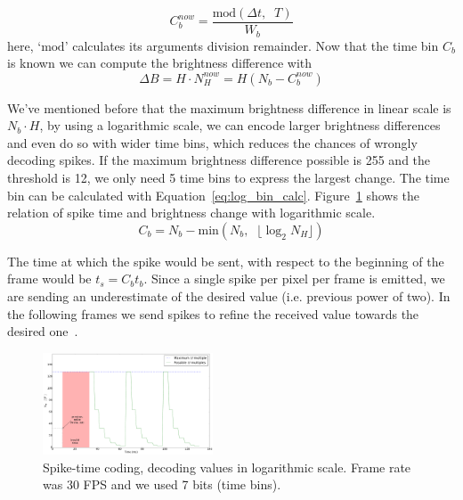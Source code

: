 \documentclass[conference]{IEEEtran}
\begin{document}
\begin{equation}
C^{now}_{b} = \frac{ \mathrm{mod}\left(\Delta t, \;\; T\right) }{ W_{b} }
\label{eq:bin_compute}
\end{equation}
here, `$\mathrm{mod}$' calculates its arguments division remainder. Now that the time bin $C_{b}$ is known we can compute the brightness difference with
\begin{equation}
 \Delta B = H\cdot N_{H}^{now} =  H\left(N_{b} - C^{now}_{b}\right) 
 \label{eq:new_Nh_linear}
\end{equation}

We've mentioned before that the maximum brightness difference in linear scale is $N_{b}\cdot H$, by using a logarithmic scale, we can encode larger brightness differences and even do so with wider time bins, which reduces the chances of wrongly decoding spikes. If the maximum brightness difference possible is 255 and the threshold is 12, we only need 5 time bins to express the largest change. 
The time bin can be calculated with Equation~\ref{eq:log_bin_calc}. Figure~\ref{fig:exponential_time} shows the relation of spike time and brightness change with logarithmic scale.
\begin{equation}
\label{eq:log_bin_calc}
C_{b} = N_{b} - \mathrm{min}\left( N_{b}, \;\; \lfloor\log_{2} N_{H}\rfloor \right) 
\end{equation}

The time at which the spike would be sent, with respect to the beginning of the frame would be $t_{s} = C_{b}t_{b}$.
Since a single spike per pixel per frame is emitted, we are sending an underestimate of the desired value (i.e. previous power of two). In the following frames we send spikes to refine the received value towards the desired one~\cite{sardac}. 

\begin{figure}[htb]
  \centering
  \includegraphics[width=0.45\textwidth]{spike_values_exp}
  
  \caption{Spike-time coding, decoding values in logarithmic scale. Frame rate was 30 FPS and we used 7 bits (time bins). }
  \label{fig:exponential_time}
\end{figure} 
\end{document}
